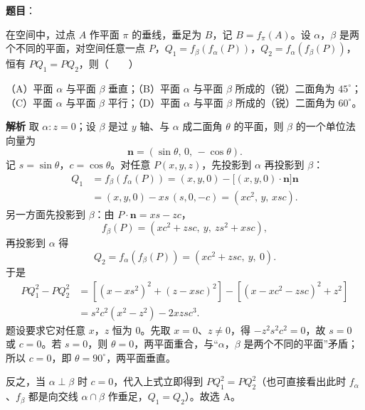 \begin{answer}

\textbf{题目}：

在空间中，过点 $A$ 作平面 $\pi$ 的垂线，垂足为 $B$，记 $B=f_\pi(A)$。设 $\alpha$，$\beta$ 是两个不同的平面，对空间任意一点 $P$，$Q_1=f_\beta(f_\alpha(P))$，$Q_2=f_\alpha(f_\beta(P))$，恒有 $PQ_1=PQ_2$，则\mbox{（　　）}

（A）平面 $\alpha$ 与平面 $\beta$ 垂直；（B）平面 $\alpha$ 与平面 $\beta$ 所成的（锐）二面角为 $45^\circ$；（C）平面 $\alpha$ 与平面 $\beta$ 平行；（D）平面 $\alpha$ 与平面 $\beta$ 所成的（锐）二面角为 $60^\circ$。

\textbf{解析}
取 $\alpha:z=0$；设 $\beta$ 是过 $y$ 轴、与 $\alpha$ 成二面角 $\theta$ 的平面，则 $\beta$ 的一个单位法向量为
\nopagebreak[4]
\[\boldsymbol n=(\sin\theta,\,0,\,-\cos\theta).\]
记 $s=\sin\theta$，$c=\cos\theta$。对任意 $P(x,y,z)$，先投影到 $\alpha$ 再投影到 $\beta$：
\nopagebreak[4]
\[\begin{aligned}
Q_1&=f_\beta(f_\alpha(P))=(x,y,0)-\bigl[(x,y,0)\cdot\boldsymbol n\bigr]\boldsymbol n\\
&=(x,y,0)-xs\,(s,0,-c)=(xc^2,\,y,\,xsc).
\end{aligned}\]
另一方面先投影到 $\beta$：由 $P\cdot\boldsymbol n=xs-zc$，
\nopagebreak[4]
\[f_\beta(P)=(xc^2+zsc,\ y,\ zs^2+xsc),\]
再投影到 $\alpha$ 得
\nopagebreak[4]
\[Q_2=f_\alpha(f_\beta(P))=(xc^2+zsc,\ y,\ 0).\]
于是
\nopagebreak[4]
\[\begin{aligned}
PQ_1^2-PQ_2^2
&=\left[(x-xs^2)^2+(z-xsc)^2\right]-\left[(x-xc^2-zsc)^2+z^2\right]\\
&=s^2c^2(x^2-z^2)-2xzsc^3.
\end{aligned}\]
题设要求它对任意 $x$，$z$ 恒为 $0$。先取 $x=0$、$z\neq0$，得 $-z^2s^2c^2=0$，故 $s=0$ 或 $c=0$。若 $s=0$，则 $\theta=0$，两平面重合，与“$\alpha$，$\beta$ 是两个不同的平面”矛盾；所以 $c=0$，即 $\theta=90^\circ$，两平面垂直。

反之，当 $\alpha\perp\beta$ 时 $c=0$，代入上式立即得到 $PQ_1^2=PQ_2^2$（也可直接看出此时 $f_\alpha$、$f_\beta$ 都是向交线 $\alpha\cap\beta$ 作垂足，$Q_1=Q_2$）。故选 A。


\end{answer}
